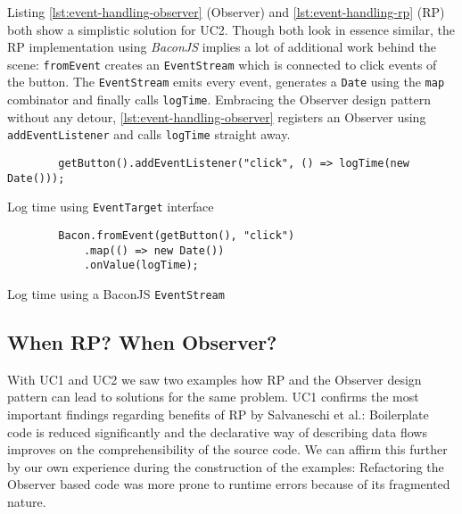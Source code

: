 \documentclass[12pt,a4paper]{article}
\begin{document}
Listing \ref{lst:event-handling-observer} (Observer) and \ref{lst:event-handling-rp} (RP) both show a simplistic solution for UC2. Though both look in essence similar, the RP implementation using \emph{BaconJS} implies a lot of additional work behind the scene: \texttt{fromEvent} creates an \texttt{EventStream} which is connected to click events of the button. The \texttt{EventStream} emits every event, generates a \texttt{Date} using the \texttt{map} combinator and finally calls \texttt{logTime}. Embracing the Observer design pattern without any detour, \ref{lst:event-handling-observer} registers an Observer using \texttt{addEventListener} and calls \texttt{logTime} straight away.

\begin{listing}[H]
	\begin{verbatim}
		getButton().addEventListener("click", () => logTime(new Date()));
	\end{verbatim}
	\caption{Log time using \texttt{EventTarget} interface}
	\label{lst:event-handling-observer}
\end{listing}

\begin{listing}[H]
	\begin{verbatim}
		Bacon.fromEvent(getButton(), "click")
			.map(() => new Date())
			.onValue(logTime);
	\end{verbatim}
	\caption{Log time using a BaconJS \texttt{EventStream}}
	\label{lst:event-handling-rp}
\end{listing}


\subsection{When RP? When Observer?}
\label{sec:when-rp-when-observer}

With UC1 and UC2 we saw two examples how RP and the Observer design pattern can lead to solutions for the same problem. UC1 confirms the most important findings regarding benefits of RP by Salvaneschi et al.: Boilerplate code is reduced significantly and the declarative way of describing data flows improves on the comprehensibility of the source code. We can affirm this further by our own experience during the construction of the examples: Refactoring the Observer based code was more prone to runtime errors because of its fragmented nature.
\end{document}
